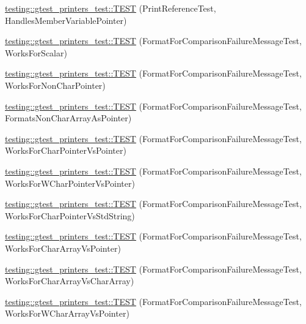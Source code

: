 \begin{DoxyCompactItemize}
\item 
\mbox{\hyperlink{namespacetesting_1_1gtest__printers__test_af9c63486049ac0ec2a1db65904702eb3}{testing\+::gtest\+\_\+printers\+\_\+test\+::\+T\+E\+ST}} (Print\+Reference\+Test, Handles\+Member\+Variable\+Pointer)
\item 
\mbox{\hyperlink{namespacetesting_1_1gtest__printers__test_aa7429c3701e464d0047a82686a5e8a46}{testing\+::gtest\+\_\+printers\+\_\+test\+::\+T\+E\+ST}} (Format\+For\+Comparison\+Failure\+Message\+Test, Works\+For\+Scalar)
\item 
\mbox{\hyperlink{namespacetesting_1_1gtest__printers__test_adb093d9323bfb766be8c91215c46056e}{testing\+::gtest\+\_\+printers\+\_\+test\+::\+T\+E\+ST}} (Format\+For\+Comparison\+Failure\+Message\+Test, Works\+For\+Non\+Char\+Pointer)
\item 
\mbox{\hyperlink{namespacetesting_1_1gtest__printers__test_a3571808f93f419268b6aed1aa127ea30}{testing\+::gtest\+\_\+printers\+\_\+test\+::\+T\+E\+ST}} (Format\+For\+Comparison\+Failure\+Message\+Test, Formats\+Non\+Char\+Array\+As\+Pointer)
\item 
\mbox{\hyperlink{namespacetesting_1_1gtest__printers__test_a1694d4063da702f5379495d3cb2cbc91}{testing\+::gtest\+\_\+printers\+\_\+test\+::\+T\+E\+ST}} (Format\+For\+Comparison\+Failure\+Message\+Test, Works\+For\+Char\+Pointer\+Vs\+Pointer)
\item 
\mbox{\hyperlink{namespacetesting_1_1gtest__printers__test_a735171f4ba0a9dffee9c4c7321107822}{testing\+::gtest\+\_\+printers\+\_\+test\+::\+T\+E\+ST}} (Format\+For\+Comparison\+Failure\+Message\+Test, Works\+For\+W\+Char\+Pointer\+Vs\+Pointer)
\item 
\mbox{\hyperlink{namespacetesting_1_1gtest__printers__test_ab5a910170489276c14b817b70d4feb96}{testing\+::gtest\+\_\+printers\+\_\+test\+::\+T\+E\+ST}} (Format\+For\+Comparison\+Failure\+Message\+Test, Works\+For\+Char\+Pointer\+Vs\+Std\+String)
\item 
\mbox{\hyperlink{namespacetesting_1_1gtest__printers__test_ac25834e0463cf9f3d231db24e7b220e5}{testing\+::gtest\+\_\+printers\+\_\+test\+::\+T\+E\+ST}} (Format\+For\+Comparison\+Failure\+Message\+Test, Works\+For\+Char\+Array\+Vs\+Pointer)
\item 
\mbox{\hyperlink{namespacetesting_1_1gtest__printers__test_aba32640344f0186de5fbb6bb47e0c5a5}{testing\+::gtest\+\_\+printers\+\_\+test\+::\+T\+E\+ST}} (Format\+For\+Comparison\+Failure\+Message\+Test, Works\+For\+Char\+Array\+Vs\+Char\+Array)
\item 
\mbox{\hyperlink{namespacetesting_1_1gtest__printers__test_a1e95289500400eff5fdcd45c5864a6d2}{testing\+::gtest\+\_\+printers\+\_\+test\+::\+T\+E\+ST}} (Format\+For\+Comparison\+Failure\+Message\+Test, Works\+For\+W\+Char\+Array\+Vs\+Pointer)

\end{DoxyCompactItemize}
